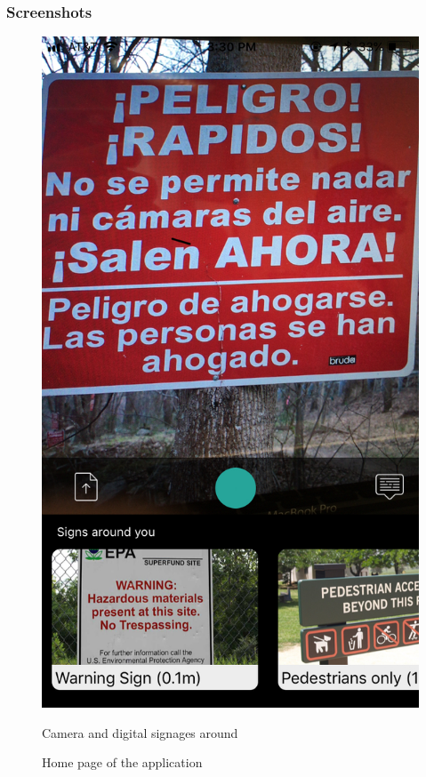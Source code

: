 \documentclass[12pt]{article}
\begin{document}
 
 \subsubsection{Screenshots}
 

 \begin{figure} [H]
\centering
\begin{minipage}{.5\textwidth}
  \centering
  \includegraphics[width=0.9\linewidth]{media/1.jpg}
  \caption{Home page of the application}{Camera and digital signages around}
  \label{fig:landing}
\end{minipage}%
\begin{minipage}{.5\textwidth}
  \centering

\end{minipage}
\end{figure}
\end{document}
